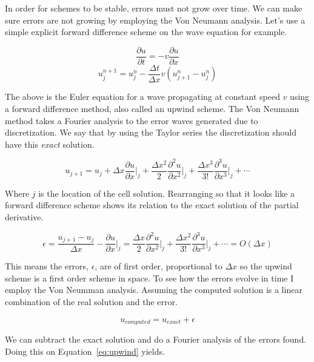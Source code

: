 \documentclass[12pt,upcase]{umlthesis}
\begin{document}
In order for schemes to be stable, errors must not grow over time. We can make sure errors are not growing by employing the Von Neumann analysis. Let's use a simple explicit forward difference scheme on the wave equation for example.

\begin{equation}
	\frac{\partial u}{\partial t} = -v\frac{\partial u}{\partial x}
\end{equation}
\begin{equation}\label{eq:upwind}
	u^{n+1}_j = u^n_j - \frac{\Delta t}{\Delta x}v(u^n_{j+1}-u^n_{j})
\end{equation}

The above is the Euler equation for a wave propagating at constant speed $v$ using a forward difference method, also called an upwind scheme. The Von Neumann method takes a Fourier analysis to the error waves generated due to discretization. We say that by using the Taylor series the discretization should have this {\it exact\/} solution.

\begin{equation}
	u_{j+1} = u_j + \Delta x {\frac{\partial u}{\partial x}}\rvert_j + \frac{\Delta x^2}{2} {\frac{\partial^2 u}{\partial x^2}}\rvert_j + \frac{\Delta x^3}{3!} {\frac{\partial^3 u}{\partial x^3}}\rvert_j + \cdots 
\end{equation}

Where $j$ is the location of the cell solution. Rearranging so that it looks like a forward difference scheme shows its relation to the exact solution of the partial derivative.

\begin{equation}
	\epsilon = \frac{u_{j+1} - u_j}{\Delta x} - {\frac{\partial u}{\partial x}}\rvert_j =  \frac{\Delta x}{2} {\frac{\partial^2 u}{\partial x^2}}\rvert_j + \frac{\Delta x^2}{3!} {\frac{\partial^3 u}{\partial x^3}}\rvert_j + \cdots = O(\Delta x)
\end{equation}

This means the errors, $\epsilon$, are of first order, proportional to $\Delta x$ so the upwind scheme is a first order scheme in space. To see how the errors evolve in time I employ the Von Neumman analysis. Assuming the computed solution is a linear combination of the real solution and the error.

\begin{equation}
	u_{computed} = u_{exact} + \epsilon
\end{equation}

We can subtract the exact solution and do a Fourier analysis of the errors found. Doing this on Equation~\ref{eq:upwind} yields.
\end{document}
